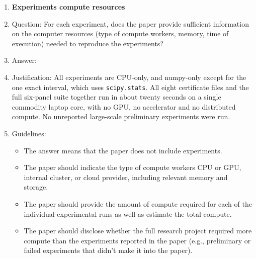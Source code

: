 \begin{enumerate}
\begin{itemize}
        \item It should be clear whether the error bar is the standard deviation or the standard error of the mean.
        \item It is OK to report 1-sigma error bars, but one should state it. The authors should preferably report a 2-sigma error bar than state that they have a 96\% CI, if the hypothesis of Normality of errors is not verified.
        \item For asymmetric distributions, the authors should be careful not to show in tables or figures symmetric error bars that would yield results that are out of range (e.g., negative error rates).
        \item If error bars are reported in tables or plots, the authors should explain in the text how they were calculated and reference the corresponding figures or tables in the text.
    \end{itemize}

\item {\bf Experiments compute resources}
    \item[] Question: For each experiment, does the paper provide sufficient information on the computer resources (type of compute workers, memory, time of execution) needed to reproduce the experiments?
    \item[] Answer: \answerYes{}
    \item[] Justification: All experiments are CPU-only, and numpy-only except for the one exact interval, which uses \texttt{scipy.stats}. All eight certificate files and the full six-panel suite together run in about twenty seconds on a single commodity laptop core, with no GPU, no accelerator and no distributed compute. No unreported large-scale preliminary experiments were run.
    \item[] Guidelines:
    \begin{itemize}
        \item The answer \answerNA{} means that the paper does not include experiments.
        \item The paper should indicate the type of compute workers CPU or GPU, internal cluster, or cloud provider, including relevant memory and storage.
        \item The paper should provide the amount of compute required for each of the individual experimental runs as well as estimate the total compute. 
        \item The paper should disclose whether the full research project required more compute than the experiments reported in the paper (e.g., preliminary or failed experiments that didn't make it into the paper). 
    \end{itemize}
    

\end{enumerate}
